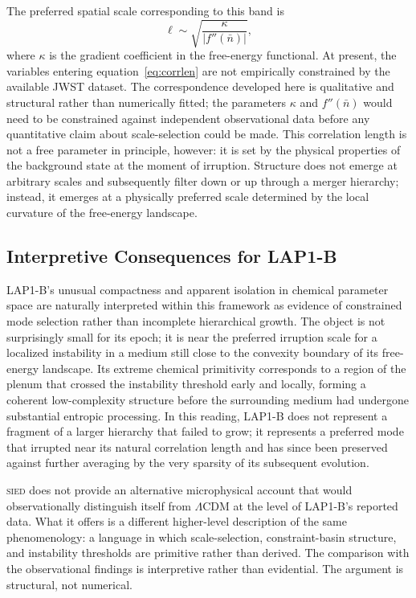 \documentclass[12pt, a4paper]{article}
\newcommand{\nbar}{\bar{n}}
\newcommand{\SIED}{\textsc{sied}}
\theoremstyle{definition}
\begin{document}
The preferred spatial scale corresponding to this band is
\begin{equation}
  \ell \sim \sqrt{\frac{\kappa}{|f''(\nbar)|}},
  \label{eq:corrlen}
\end{equation}
where $\kappa$ is the gradient coefficient in the free-energy functional.
At present, the variables entering equation~\eqref{eq:corrlen} are not
empirically constrained by the available JWST dataset. The correspondence
developed here is qualitative and structural rather than numerically fitted;
the parameters $\kappa$ and $f''(\nbar)$ would need to be constrained against
independent observational data before any quantitative claim about
scale-selection could be made. This correlation length is not a free parameter
in principle, however: it is set by the physical properties of the background
state at the moment of irruption. Structure does not emerge at arbitrary scales
and subsequently filter down or up through a merger hierarchy; instead, it
emerges at a physically preferred scale determined by the local curvature of
the free-energy landscape.

\subsection{Interpretive Consequences for LAP1-B}

LAP1-B's unusual compactness and apparent isolation in chemical parameter
space are naturally interpreted within this framework as evidence of
constrained mode selection rather than incomplete hierarchical growth. The
object is not surprisingly small for its epoch; it is near the preferred
irruption scale for a localized instability in a medium still close to the
convexity boundary of its free-energy landscape. Its extreme chemical
primitivity corresponds to a region of the plenum that crossed the instability
threshold early and locally, forming a coherent low-complexity structure
before the surrounding medium had undergone substantial entropic processing.
In this reading, LAP1-B does not represent a fragment of a larger hierarchy
that failed to grow; it represents a preferred mode that irrupted near its
natural correlation length and has since been preserved against further
averaging by the very sparsity of its subsequent evolution.

\SIED{} does not provide an alternative microphysical account that would
observationally distinguish itself from $\Lambda$CDM at the level of LAP1-B's
reported data. What it offers is a different higher-level description of the
same phenomenology: a language in which scale-selection, constraint-basin
structure, and instability thresholds are primitive rather than derived.
The comparison with the observational findings is interpretive rather than
evidential. The argument is structural, not numerical.
\end{document}
